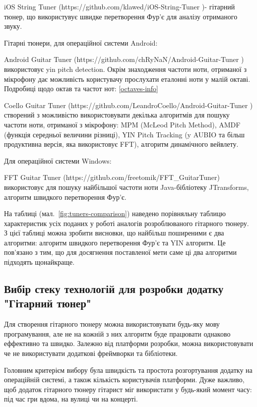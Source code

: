 iOS String Tuner (https://github.com/klawed/iOS-String-Tuner
)- гітарний тюнер, що використувує швидке перетворення Фур'є для аналізу отриманого звуку.

Гітарні тюнери, для операційної системи Android:

Android Guitar Tuner (https://github.com/chRyNaN/Android-Guitar-Tuner
) використовує yin pitch detection. Окрім знаходження частоти ноти, отриманої з мікрофону дає можливість користувачу прослухати еталонні ноти у малій октаві. Подробиці щодо октав та частот нот: \ref{octaves-info}

Coello Guitar Tuner (https://github.com/LeandroCoello/Android-Guitar-Tuner
) створений з можливістю використовувати декілька алгоритмів для пошуку частоти ноти, отриманої з мікрофону: MPM (McLeod Pitch Method), AMDF (функція середньої величини різниці), YIN Pitch Tracking (y AUBIO та більш продуктивна версія, яка використовує FFT), алгоритм динамічного вейвлету.

Для операційної системи Windows: 

FFT Guitar Tuner (https://github.com/freetomik/FFT\_GuitarTuner) використовує для пошуку найбільшої частоти ноти Java-бібліотеку JTransforms, алгоритм швидкого перетворення Фур'є.


На таблиці (мал.~\ref{fig:tuners-comparison}) наведено порівняльну таблицю характеристик усіх поданих у роботі аналогів розроблюваного гітарного тюнеру. 
З цієї таблиці можна зробити висновки, що найбільш поширеними є два алгоритми: алгоритм швидкого перетворення Фур'є та YIN алгоритм. Це пов'язано з тим, що для досягнення поставленої мети саме ці два алгоритми підходять щонайкраще.

\subsection{Вибір стеку технологій для розробки додатку "Гітарний тюнер"}

Для створення гітарного тюнеру можна використовувати будь-яку мову програмування, але не на кожній з них алгоритм буде працювати однаково еффективно та швидко. Залежно від платформи розробки, можна використовувати че не використувати додаткові фреймворки та бібліотеки. 

Головним критерієм вибору була швидкість та простота розгортування додатку на операційній системі, а також кількість користувачів платформи. Дуже важливо, щоб додаток гітарного тюнеру гітарист міг використати у будь-який момент часу: під час гри вдома, на вулиці чи на концерті. 

